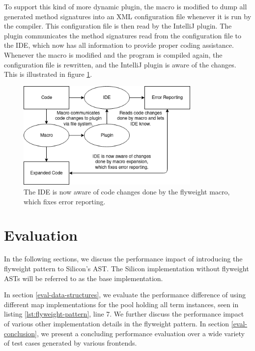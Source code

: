 \documentclass[11pt]{article}
\begin{document}
    To support this kind of more dynamic plugin, the macro is modified to
    dump all generated method signatures into an XML configuration file whenever
    it is run by the compiler.
    This configuration file is then read by the IntelliJ plugin. The plugin
    communicates the method signatures read from the configuration file
    to the IDE, which now has all information to provide proper
    coding assistance.
    Whenever the macro is modified and the program is compiled again,
    the configuration file is rewritten, and the IntelliJ plugin is
    aware of the changes. This is illustrated in figure \ref{fig:ide-fixed-generic}.

    \begin{figure}[H]
        \begin{center}
            \includegraphics[width=0.8\textwidth]{ide-fixed-generic.png}
            \caption{The IDE is now aware of code changes done by the flyweight macro, which fixes error reporting.}
            \label{fig:ide-fixed-generic}
        \end{center}   
    \end{figure}

    \newpage
    \section{Evaluation}

    In the following sections, we discuss the performance
    impact of introducing the flyweight pattern to Silicon's AST.
    The Silicon implementation without flyweight
    ASTs will be referred to as the base implementation.

    In section \ref{eval-data-structures}, we evaluate the performance difference of using
    different map implementations for the pool holding all
    term instances, seen in listing \ref{lst:flyweight-pattern}, line 7.
    We further discuss the performance impact
    of various other implementation details in the flyweight pattern.
    In section \ref{eval-conclusion}, we present a concluding performance
    evaluation over a wide variety of test cases generated by various frontends.
\end{document}
